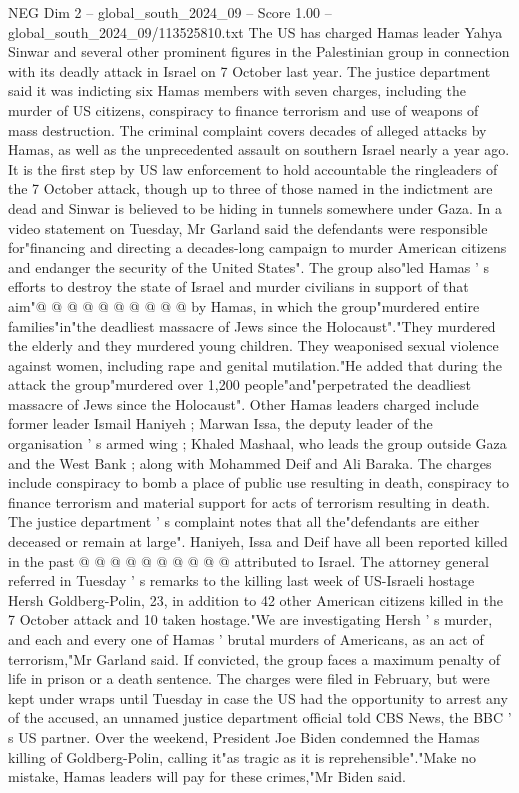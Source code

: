\begin{textsample}{NEG Dim 2 – global\_south\_2024\_09 – Score 1.00 – global\_south\_2024\_09/113525810.txt}  \label{ex:f2_neg_411}
The US has charged Hamas leader Yahya Sinwar and several other prominent figures in the Palestinian group in connection with its deadly attack in Israel on 7 October last year.
The justice department said it was indicting six Hamas members with seven charges, including the murder of US citizens, conspiracy to finance terrorism and use of weapons of mass destruction.
The criminal complaint covers decades of alleged attacks by Hamas, as well as the unprecedented assault on southern Israel nearly a year ago.
It is the first step by US law enforcement to hold accountable the ringleaders of the 7 October attack, though up to three of those named in the indictment are dead and Sinwar is believed to be hiding in tunnels somewhere under Gaza.
In a video statement on Tuesday, Mr Garland said the defendants were responsible for"financing and directing a decades-long campaign to murder American citizens and endanger the security of the United States".
The group also"led Hamas ' s efforts to destroy the state of Israel and murder civilians in support of that aim"@ @ @ @ @ @ @ @ @ @ by Hamas, in which the group"murdered entire families"in"the deadliest massacre of Jews since the Holocaust"."They murdered the elderly and they murdered young children.
They weaponised sexual violence against women, including rape and genital mutilation."He added that during the attack the group"murdered over 1,200 people"and"perpetrated the deadliest massacre of Jews since the Holocaust".
Other Hamas leaders charged include former leader Ismail Haniyeh ; Marwan Issa, the deputy leader of the organisation ' s armed wing ; Khaled Mashaal, who leads the group outside Gaza and the West Bank ; along with Mohammed Deif and Ali Baraka.
The charges include conspiracy to bomb a place of public use resulting in death, conspiracy to finance terrorism and material support for acts of terrorism resulting in death.
The justice department ' s complaint notes that all the"defendants are either deceased or remain at large".
Haniyeh, Issa and Deif have all been reported killed in the past @ @ @ @ @ @ @ @ @ @ attributed to Israel.
The attorney general referred in Tuesday ' s remarks to the killing last week of US-Israeli hostage Hersh Goldberg-Polin, 23, in addition to 42 other American citizens killed in the 7 October attack and 10 taken hostage."We are investigating Hersh ' s murder, and each and every one of Hamas ' brutal murders of Americans, as an act of terrorism,"Mr Garland said.
If convicted, the group faces a maximum penalty of life in prison or a death sentence.
The charges were filed in February, but were kept under wraps until Tuesday in case the US had the opportunity to arrest any of the accused, an unnamed justice department official told CBS News, the BBC ' s US partner.
Over the weekend, President Joe Biden condemned the Hamas killing of Goldberg-Polin, calling it"as tragic as it is reprehensible"."Make no mistake, Hamas leaders will pay for these crimes,"Mr Biden said.

\end{textsample}
